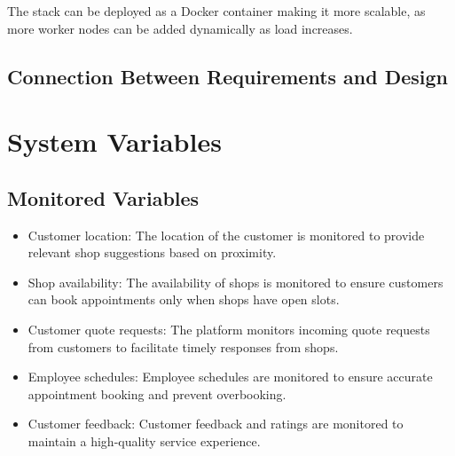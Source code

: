 \documentclass[12pt, titlepage]{article}
\begin{document}
\noindent The stack can be deployed as a Docker container making it more scalable, as more worker nodes can be added dynamically as load increases. 

\subsection{Connection Between Requirements and Design} \label{SecConnection}



\section{System Variables}

\subsection{Monitored Variables}
\begin{itemize}
    \item Customer location: The location of the customer is monitored to provide relevant shop suggestions based on proximity.
    \item Shop availability: The availability of shops is monitored to ensure customers can book appointments only when shops have open slots.
    \item Customer quote requests: The platform monitors incoming quote requests from customers to facilitate timely responses from shops.
    \item Employee schedules: Employee schedules are monitored to ensure accurate appointment booking and prevent overbooking.
    \item Customer feedback: Customer feedback and ratings are monitored to maintain a high-quality service experience.
\end{itemize}
\end{document}
